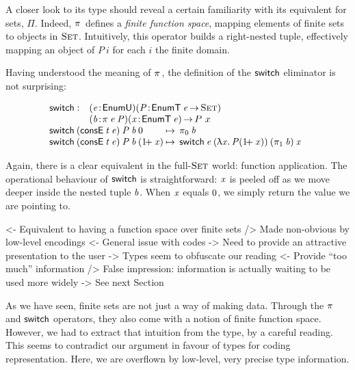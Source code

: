 A closer look to its type should reveal a certain familiarity with its
equivalent for sets, $\Pi$. Indeed, $\spi{\!}{\!}$ defines a
\emph{finite function space}, mapping elements of finite sets to
objects in $\Set$. Intuitively, this operator builds a right-nested
tuple, effectively mapping an object of $P\:i$ for each $i$ the finite
domain.

Having understood the meaning of $\spi{\!}{\!}$, the definition of the
$\F{switch}$ eliminator is not surprising:

\[\stk{
\begin{array}{@{}ll}
\F{switch} : & \PITEL{\V{e}}{\EnumU}
               \PITEL{\V{P}}{\EnumT{\V{e}} \To \Set} \\
             & \PITEL{\V{b}}{\spi{\V{e}}{\V{P}}}
               \PITEL{\V{x}}{\EnumT{\V{e}}} \To P~x
\end{array} \\
\begin{array}{@{}l@{\:\mapsto\:\:}l}
\switch{(\ConsE{\V{t}}{\V{e}})}{\V{P}}{\V{b}}{\Ze}      & \fst{\V{b}} \\
\switch{(\ConsE{\V{t}}{\V{e}})}{\V{P}}{\V{b}}{(\Su{\V{x}})} & \switch{\V{e}}{(\LAM{\V{x}} \V{P}
  (\Su{\V{x}}))}{(\snd{\V{b}})}{\V{x}}
\end{array}
}\]

Again, there is a clear equivalent in the full-$\Set$ world: function
application. The operational behaviour of $\F{switch}$ is
straightforward: $\V{x}$ is peeled off as we move deeper inside the nested
tuple $\V{b}$. When $\V{x}$ equals $\Ze$, we simply return the value we are
pointing to.

\begin{wstructure}
<- Equivalent to having a function space over finite sets
    /> Made non-obvious by low-level encodings
        <- General issue with codes
             -> Need to provide an attractive presentation to the user
    -> Types seem to obfuscate our reading
        <- Provide ``too much'' information
        /> False impression: information is actually waiting to be used more widely
        -> See next Section
\end{wstructure}

As we have seen, finite sets are not just a way of making
data. Through the $\spi{\!}{\!}$ and $\F{switch}$ operators, they also
come with a notion of finite function space. However, we had to
extract that intuition from the type, by a careful reading. This seems
to contradict our argument in favour of types for coding
representation. Here, we are overflown by low-level, very precise type
information.

